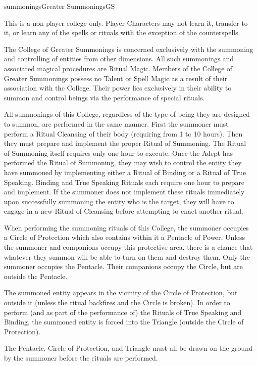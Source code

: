 \begin{College}[1.0]{summonings}{Greater Summonings}{GS}

This is a non-player college only.  Player Characters may not learn
it, transfer to it, or learn any of the spells or rituals with the
exception of the counterspells.

The College of Greater Summonings is concerned exclusively with the
summoning and controlling of entities from other dimensions.  All such
summonings and associated magical procedures are Ritual Magic.
Members of the College of Greater Summonings possess no Talent or
Spell Magic as a result of their association with the College.  Their
power lies exclusively in their ability to summon and control beings
via the performance of special rituals.

All summonings of this College, regardless of the type of being they
are designed to summon, are performed in the same manner. First the
summoner must perform a Ritual Cleansing of their body (requiring from
1 to 10 hours).  Then they must prepare and implement the proper
Ritual of Summoning.  The Ritual of Summoning itself requires only
one hour to execute.  Once the Adept has performed the Ritual of
Summoning, they may wish to control the entity they have summoned by
implementing either a Ritual of Binding or a Ritual of True Speaking.
Binding and True Speaking Rituals each require one hour to prepare and
implement.  If the summoner does not implement these rituals
immediately upon successfully summoning the entity who is the target,
they will have to engage in a new Ritual of Cleansing before
attempting to enact another ritual.

When performing the summoning rituals of this College, the summoner
occupies a Circle of Protection which also contains within it a
Pentacle of Power.  Unless the summoner and companions occupy this
protective area, there is a chance that whatever they summon will be
able to turn on them and destroy them. Only the summoner occupies the
Pentacle. Their companions occupy the Circle, but are outside the
Pentacle.

The summoned entity appears in the vicinity of the Circle of
Protection, but outside it (unless the ritual backfires and the Circle
is broken).  In order to perform (and as part of the performance of)
the Rituals of True Speaking and Binding, the summoned entity is
forced into the Triangle (outside the Circle of Protection).

The Pentacle, Circle of Protection, and Triangle must all be drawn on
the ground by the summoner before the rituals are performed.


\end{College}
